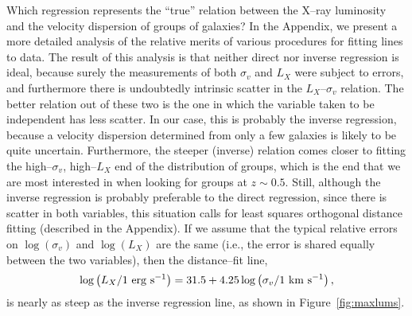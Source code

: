 \documentclass[12pt,preprint]{aastex}
\begin{document}
Which regression represents the ``true'' relation between the X--ray
luminosity and the velocity dispersion of groups of galaxies?
In the Appendix, we present a more detailed analysis of the relative merits of
various procedures for fitting lines to data.  The result of this analysis
is that neither direct nor inverse regression is ideal,
because surely the measurements of both $\sigma_v$ and $L_X$
were subject to errors, and furthermore there is
undoubtedly intrinsic scatter in the $L_X$--$\sigma_v$ relation.  The better
relation out of these two is the one in which the variable taken to be
independent has less scatter.
In our case, this is probably the inverse regression,
because a velocity dispersion determined from only a few galaxies is
likely to be quite uncertain.  Furthermore, the steeper (inverse) relation
comes closer to fitting the high--$\sigma_v$, high--$L_X$ end of the
distribution of groups, which is the end that we are most interested in
when looking for groups at $z\sim 0.5$.
Still, although the inverse regression is probably preferable to the direct
regression, since there is scatter in both
variables, this situation calls for least squares orthogonal distance
fitting (described in the Appendix).  If we assume that the typical relative
errors on $\log(\sigma_v)$ and
$\log(L_X)$ are the same (i.e., the error is shared equally between the two
variables), then the distance--fit line,
\begin{equation}
\log \left(L_X / 1 {\rm~erg~s^{-1}}\right) = 31.5 + 4.25 \log \left( \sigma_v / 1 {\rm~km~s^{-1}} \right),
\label{eq:distfit}
\end{equation}
is nearly
as steep as the inverse regression line, as shown in Figure~\ref{fig:maxlums}.
\end{document}
